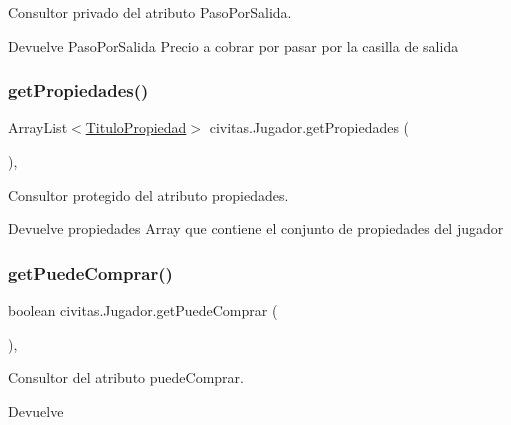 Consultor privado del atributo Paso\+Por\+Salida. \begin{DoxyReturn}{Devuelve}
Paso\+Por\+Salida Precio a cobrar por pasar por la casilla de salida 
\end{DoxyReturn}
\mbox{\label{classcivitas_1_1Jugador_a2927df4695696abd841c71f6c3eba318}} 
\subsubsection{\texorpdfstring{get\+Propiedades()}{getPropiedades()}}
{\footnotesize\ttfamily Array\+List$<$\hyperlink{classcivitas_1_1TituloPropiedad}{Titulo\+Propiedad}$>$ civitas.\+Jugador.\+get\+Propiedades (\begin{DoxyParamCaption}{ }\end{DoxyParamCaption})\hspace{0.3cm}{\ttfamily [inline]}, {\ttfamily [protected]}}

Consultor protegido del atributo propiedades. \begin{DoxyReturn}{Devuelve}
propiedades Array que contiene el conjunto de propiedades del jugador 
\end{DoxyReturn}
\mbox{\label{classcivitas_1_1Jugador_a1b548df1bff7883664b0848408ed0232}} 
\subsubsection{\texorpdfstring{get\+Puede\+Comprar()}{getPuedeComprar()}}
{\footnotesize\ttfamily boolean civitas.\+Jugador.\+get\+Puede\+Comprar (\begin{DoxyParamCaption}{ }\end{DoxyParamCaption})\hspace{0.3cm}{\ttfamily [inline]}, {\ttfamily [package]}}

Consultor del atributo puede\+Comprar. \begin{DoxyReturn}{Devuelve}

\end{DoxyReturn}

